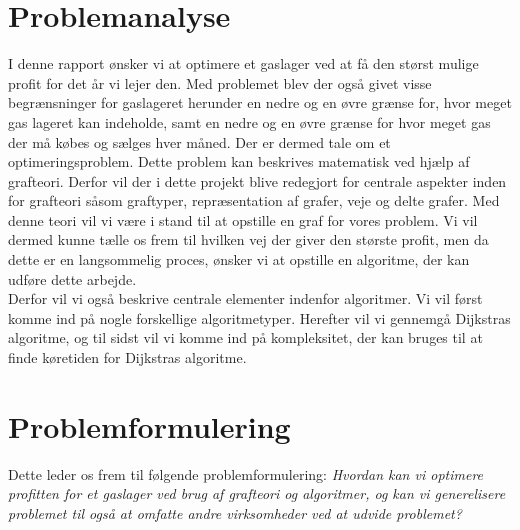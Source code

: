 \section{Problemanalyse}
I denne rapport ønsker vi at optimere et gaslager ved at få den størst mulige profit for det år vi lejer den. Med problemet blev der også givet visse begrænsninger for gaslageret herunder en nedre og en øvre grænse for, hvor meget gas lageret kan indeholde, samt en nedre og en øvre grænse for hvor meget gas der må købes og sælges hver måned. Der er dermed tale om et optimeringsproblem. Dette problem kan beskrives matematisk ved hjælp af grafteori. Derfor vil der i dette projekt blive redegjort for centrale aspekter inden for grafteori såsom
graftyper, repræsentation af grafer, veje og delte grafer. Med denne teori vil vi være i stand til at opstille en graf for vores problem. Vi vil dermed kunne tælle os frem til hvilken vej der giver den største profit, men da dette er en langsommelig proces, ønsker vi at opstille en algoritme, der kan udføre dette arbejde. \\ Derfor vil vi også beskrive centrale elementer indenfor algoritmer. Vi vil først komme ind på nogle forskellige algoritmetyper. Herefter vil vi gennemgå Dijkstras algoritme, og til sidst vil vi komme ind på kompleksitet, der kan bruges til at finde køretiden for Dijkstras algoritme.

\section{Problemformulering}
Dette leder os frem til følgende problemformulering:
\textit{Hvordan kan vi optimere profitten for et gaslager ved brug af grafteori og algoritmer, og kan vi generelisere problemet til også at omfatte andre virksomheder ved at udvide problemet?}


